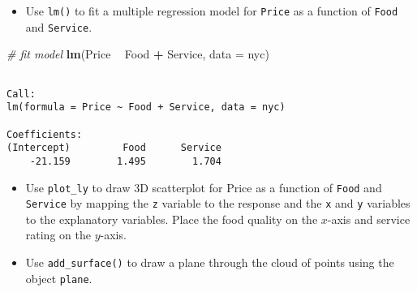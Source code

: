 \documentclass[]{book}
\newenvironment{Shaded}{\begin{snugshade}}{\end{snugshade}}
\newcommand{\KeywordTok}[1]{\textcolor[rgb]{0.13,0.29,0.53}{\textbf{#1}}}
\newcommand{\DataTypeTok}[1]{\textcolor[rgb]{0.13,0.29,0.53}{#1}}
\newcommand{\FloatTok}[1]{\textcolor[rgb]{0.00,0.00,0.81}{#1}}
\newcommand{\StringTok}[1]{\textcolor[rgb]{0.31,0.60,0.02}{#1}}
\newcommand{\CommentTok}[1]{\textcolor[rgb]{0.56,0.35,0.01}{\textit{#1}}}
\newcommand{\OperatorTok}[1]{\textcolor[rgb]{0.81,0.36,0.00}{\textbf{#1}}}
\newcommand{\NormalTok}[1]{#1}
\providecommand{\tightlist}{%
  \setlength{\itemsep}{0pt}\setlength{\parskip}{0pt}}
\begin{document}
\begin{itemize}
\tightlist
\item
  Use \texttt{lm()} to fit a multiple regression model for
  \texttt{Price} as a function of \texttt{Food} and \texttt{Service}.
\end{itemize}

\begin{Shaded}
\begin{Highlighting}[]
\CommentTok{# fit model}
\KeywordTok{lm}\NormalTok{(Price }\OperatorTok{~}\StringTok{ }\NormalTok{Food }\OperatorTok{+}\StringTok{ }\NormalTok{Service, }\DataTypeTok{data =}\NormalTok{ nyc)}
\end{Highlighting}
\end{Shaded}

\begin{verbatim}

Call:
lm(formula = Price ~ Food + Service, data = nyc)

Coefficients:
(Intercept)         Food      Service  
    -21.159        1.495        1.704  
\end{verbatim}

\begin{itemize}
\tightlist
\item
  Use \texttt{plot\_ly} to draw 3D scatterplot for Price as a function
  of \texttt{Food} and \texttt{Service} by mapping the \texttt{z}
  variable to the response and the \texttt{x} and \texttt{y} variables
  to the explanatory variables. Place the food quality on the \(x\)-axis
  and service rating on the \(y\)-axis.
\end{itemize}

\begin{Shaded}
\end{Shaded}

\hypertarget{htmlwidget-3423e12707dfd0ca6570}{}

\begin{itemize}
\tightlist
\item
  Use \texttt{add\_surface()} to draw a plane through the cloud of
  points using the object \texttt{plane}.
\end{itemize}
\end{document}
